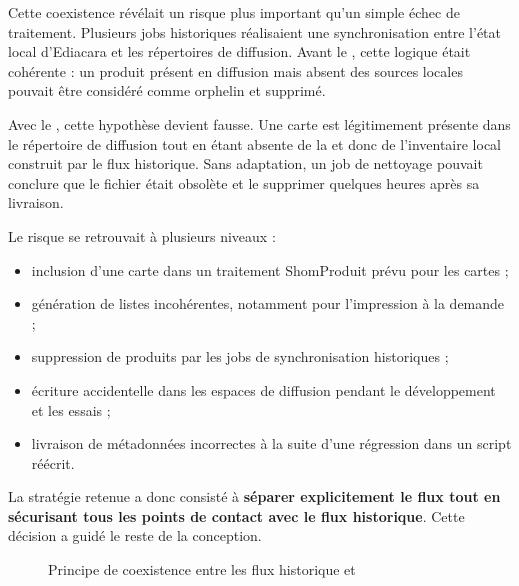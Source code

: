 Cette coexistence révélait un risque plus important qu'un simple échec de traitement. Plusieurs jobs historiques réalisaient une synchronisation entre l'état local d'Ediacara et les répertoires de diffusion. Avant le , cette logique était cohérente : un produit présent en diffusion mais absent des sources locales pouvait être considéré comme orphelin et supprimé.

Avec le , cette hypothèse devient fausse. Une carte  est légitimement présente dans le répertoire de diffusion tout en étant absente de la  et donc de l'inventaire local construit par le flux historique. Sans adaptation, un job de nettoyage pouvait conclure que le fichier  était obsolète et le supprimer quelques heures après sa livraison.

Le risque se retrouvait à plusieurs niveaux :

\begin{itemize}
    \item inclusion d'une carte  dans un traitement ShomProduit prévu pour les cartes  ;
    \item génération de listes incohérentes, notamment pour l'impression à la demande ;
    \item suppression de produits  par les jobs de synchronisation historiques ;
    \item écriture accidentelle dans les espaces de diffusion pendant le développement et les essais ;
    \item livraison de métadonnées incorrectes à la suite d'une régression dans un script réécrit.
\end{itemize}

La stratégie retenue a donc consisté à \textbf{séparer explicitement le flux  tout en sécurisant tous les points de contact avec le flux historique}. Cette décision a guidé le reste de la conception.

\begin{figure}[H]
\centering
{}
\caption{Principe de coexistence entre les flux historique et }
\label{fig:flux-fcu-historique}
\end{figure}

